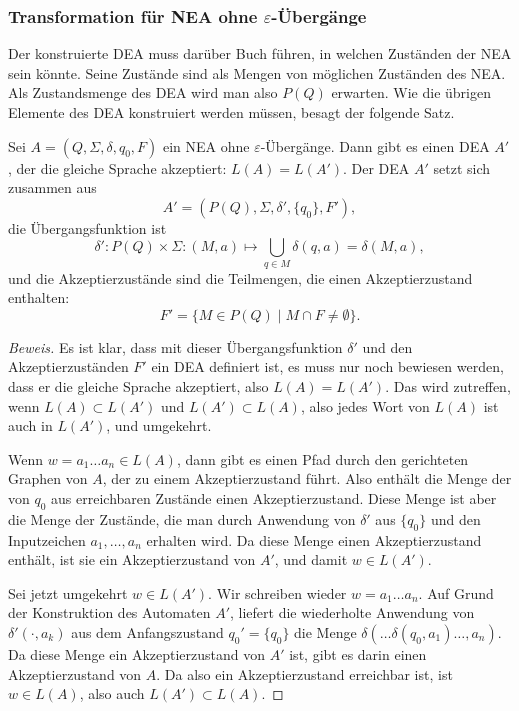 \subsubsection{Transformation für NEA ohne $\varepsilon$-Übergänge}
Der konstruierte DEA muss darüber Buch führen, in welchen Zuständen
der NEA sein könnte.
Seine Zustände sind als Mengen von möglichen Zuständen des NEA.
Als Zustandsmenge des DEA wird man also $P(Q)$ 
erwarten.
Wie die übrigen Elemente des DEA konstruiert werden müssen,
besagt der folgende Satz.

\begin{satz}
\label{satz_neadea_eps}
Sei $A=(Q,\Sigma,\delta,q_0,F)$ ein NEA ohne $\varepsilon$-Übergänge.
Dann gibt es einen DEA $A'$, der die gleiche Sprache akzeptiert: $L(A)=L(A')$.
Der DEA $A'$ setzt sich zusammen aus
\[
A'=
(P(Q), \Sigma, \delta', \{q_0\}, F'),
\]
die Übergangsfunktion ist
\[
\delta'\colon P(Q)\times \Sigma: (M, a)\mapsto \bigcup_{q\in M} \delta(q,a)
=\delta(M,a),
\]
und die Akzeptierzustände sind die Teilmengen, die einen Akzeptierzustand
enthalten:
\[
F'=\{M\in P(Q)\;|\;M\cap F\ne \emptyset\}.
\]
\end{satz}
\begin{proof}[Beweis]
Es ist klar, dass mit dieser Übergangsfunktion $\delta'$ und den
Akzeptierzuständen $F'$ ein DEA definiert ist, es muss nur noch
bewiesen werden, dass er die gleiche Sprache akzeptiert, also
$L(A)=L(A')$.
Das wird zutreffen, wenn $L(A)\subset L(A')$ und
$L(A')\subset L(A)$, also jedes Wort von $L(A)$ ist auch in $L(A')$,
und umgekehrt.

Wenn $w=a_1\dots a_n\in L(A)$, dann gibt es einen Pfad durch den gerichteten
Graphen von $A$, der zu einem Akzeptierzustand führt.
Also enthält
die Menge der von $q_0$ aus erreichbaren Zustände einen Akzeptierzustand.
Diese Menge ist aber die Menge der Zustände, die man durch Anwendung
von $\delta'$ aus $\{q_0\}$ und den Inputzeichen $a_1,\dots,a_n$ erhalten
wird.
Da diese Menge einen Akzeptierzustand enthält, ist sie ein
Akzeptierzustand von $A'$, und damit $w\in L(A')$.

Sei jetzt umgekehrt $w\in L(A')$.
Wir schreiben wieder $w=a_1\dots a_n$.
Auf Grund der Konstruktion des Automaten $A'$, liefert die wiederholte
Anwendung von $\delta'(\cdot, a_k)$ aus dem Anfangszustand $q_0'=\{q_0\}$
die Menge $\delta(\dots\delta(q_0, a_1)\dots ,a_n)$.
Da diese Menge ein
Akzeptierzustand von $A'$ ist, gibt es darin einen Akzeptierzustand
von $A$.
Da also ein Akzeptierzustand erreichbar ist, ist $w\in L(A)$,
also auch $L(A')\subset L(A)$.
\end{proof}

